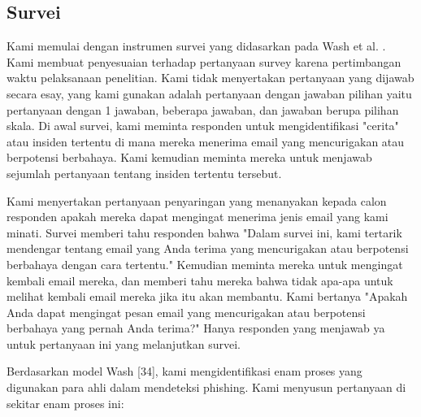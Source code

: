 \documentclass[lettersize,journal]{IEEEtran}
\begin{document}
\subsection{Survei}
Kami memulai dengan instrumen survei yang didasarkan pada Wash et al.
\cite{ref10}. Kami membuat penyesuaian terhadap pertanyaan survey karena
pertimbangan waktu pelaksanaan penelitian. Kami tidak menyertakan pertanyaan
yang dijawab secara esay, yang kami gunakan adalah pertanyaan dengan jawaban
pilihan yaitu pertanyaan dengan 1 jawaban, beberapa jawaban, dan jawaban berupa
pilihan skala. Di awal survei, kami meminta responden untuk mengidentifikasi
"cerita" atau insiden tertentu di mana mereka menerima email yang mencurigakan
atau berpotensi berbahaya. Kami kemudian meminta mereka untuk menjawab sejumlah
pertanyaan tentang insiden tertentu tersebut.

Kami menyertakan pertanyaan penyaringan yang menanyakan kepada calon responden
apakah mereka dapat mengingat menerima jenis email yang kami minati. Survei
memberi tahu responden bahwa "Dalam survei ini, kami tertarik mendengar tentang
email yang Anda terima yang mencurigakan atau berpotensi berbahaya dengan cara
tertentu." Kemudian meminta mereka untuk mengingat kembali email mereka, dan
memberi tahu mereka bahwa tidak apa-apa untuk melihat kembali email mereka jika
itu akan membantu. Kami bertanya "Apakah Anda dapat mengingat pesan email yang
mencurigakan atau berpotensi berbahaya yang pernah Anda terima?" Hanya
responden yang menjawab ya untuk pertanyaan ini yang melanjutkan survei.

Berdasarkan model Wash [34], kami mengidentifikasi enam proses yang digunakan
para ahli dalam mendeteksi phishing. Kami menyusun pertanyaan di sekitar enam
proses ini:
\end{document}
